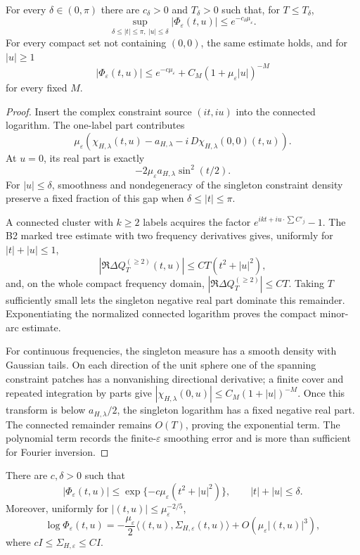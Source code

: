 \begin{lemma}
\label{lem:r4-b1-singleton-gap}
For every \(\delta\in(0,\pi)\) there are \(c_\delta>0\) and
\(T_\delta>0\) such that, for \(T\le T_\delta\),
\[
 \sup_{\delta\le|t|\le\pi,\ |u|\le\delta}
 |\Phi_\varepsilon(t,u)|
 \le e^{-c_\delta\mu_\varepsilon}.
\]
For every compact set not containing \((0,0)\), the same estimate holds, and
for \(|u|\ge1\)
\[
 |\Phi_\varepsilon(t,u)|
 \le e^{-c\mu_\varepsilon}
 +C_M(1+\mu_\varepsilon|u|)^{-M}
\]
for every fixed \(M\).
\end{lemma}

\begin{proof}
Insert the complex constraint source
\((it,i u)\) into the connected logarithm.  The one-label part contributes
\[
 \mu_\varepsilon
 \left(\chi_{H,\lambda}(t,u)-a_{H,\lambda}
 -i\,D\chi_{H,\lambda}(0,0)(t,u)\right).
\]
At \(u=0\), its real part is exactly
\[
 -2\mu_\varepsilon a_{H,\lambda}\sin^2(t/2).
\]
For \(|u|\le\delta\), smoothness and nondegeneracy of the singleton constraint
density preserve a fixed fraction of this gap when
\(\delta\le|t|\le\pi\).

A connected cluster with \(k\ge2\) labels acquires the factor
\(e^{ikt+i u\cdot\sum C'_j}-1\).  The B2 marked tree estimate with two
frequency derivatives gives, uniformly for \(|t|+|u|\le1\),
\[
 \left|\Re\Delta Q_T^{(\ge2)}(t,u)\right|
 \le CT(t^2+|u|^2),
\]
and, on the whole compact frequency domain,
\(|\Re\Delta Q_T^{(\ge2)}|\le CT\).  Taking \(T\) sufficiently small lets
the singleton negative real part dominate this remainder.  Exponentiating the
normalized connected logarithm proves the compact minor-arc estimate.

For continuous frequencies, the singleton measure has a smooth density with
Gaussian tails.  On each direction of the unit sphere one of the spanning
constraint patches has a nonvanishing directional derivative; a finite cover
and repeated integration by parts give
\(|\chi_{H,\lambda}(0,u)|\le C_M(1+|u|)^{-M}\).  Once this transform is below
\(a_{H,\lambda}/2\), the singleton logarithm has a fixed negative real part.
The connected remainder remains \(O(T)\), proving the exponential term.  The
polynomial term records the finite-\(\varepsilon\) smoothing error and is
more than sufficient for Fourier inversion.
\end{proof}

\begin{lemma}
\label{lem:r3-b1-gap}
There are \(c,\delta>0\) such that
\[
 |\Phi_\varepsilon(t,u)|
 \le\exp\{-c\mu_\varepsilon(t^2+|u|^2)\},
 \qquad |t|+|u|\le\delta.
\]
Moreover, uniformly for \(|(t,u)|\le\mu_\varepsilon^{-2/5}\),
\[
 \log\Phi_\varepsilon(t,u)
 =-\frac{\mu_\varepsilon}{2}
 \langle(t,u),\Sigma_{H,\varepsilon}(t,u)\rangle
 +O(\mu_\varepsilon|(t,u)|^3),
\]
where \(cI\le\Sigma_{H,\varepsilon}\le CI\).
\end{lemma}

